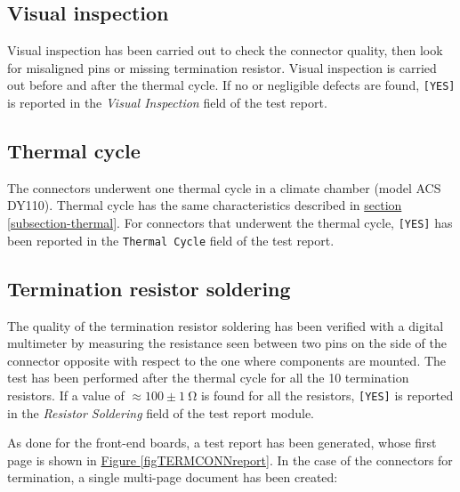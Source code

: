 \subsection{Visual inspection}
Visual inspection has been carried out to check the connector quality, then look for misaligned pins or missing termination resistor. Visual inspection is carried out before and after the thermal cycle. If no or negligible defects are found, \texttt{[YES]} is reported in the \textit{Visual Inspection} field of the test report.

\subsection{Thermal cycle}
The connectors underwent one thermal cycle in a climate chamber (model ACS DY110). Thermal cycle has the same characteristics described in \hyperref[subsection-thermal]{section \ref{subsection-thermal}}. For connectors that underwent the thermal cycle, \texttt{[YES]} has been reported in the \texttt{Thermal Cycle} field of the test report.

\subsection{Termination resistor soldering}
The quality of the termination resistor soldering has been verified with a digital multimeter by measuring the resistance seen between two pins on the side of the connector opposite with respect to the one where components are mounted. The test has been performed after the thermal cycle for all the 10 termination resistors. If a value of $\approx100\pm\SI{1}{\ohm}$ is found for all the resistors, \texttt{[YES]} is reported in the \textit{Resistor Soldering} field of the test report module.

\par
As done for the front-end boards, a test report has been generated, whose first page is shown in \hyperref[figTERMCONNreport]{Figure \ref{figTERMCONNreport}}. In the case of the connectors for termination, a single multi-page document has been created:

\begin{table}[ht]
    \centering
    \def\arraystretch{1.3}
    \caption{Structure of the entry for the termination connectors test report.}
    \label{tabTERMCONNstruct}
\end{table}


